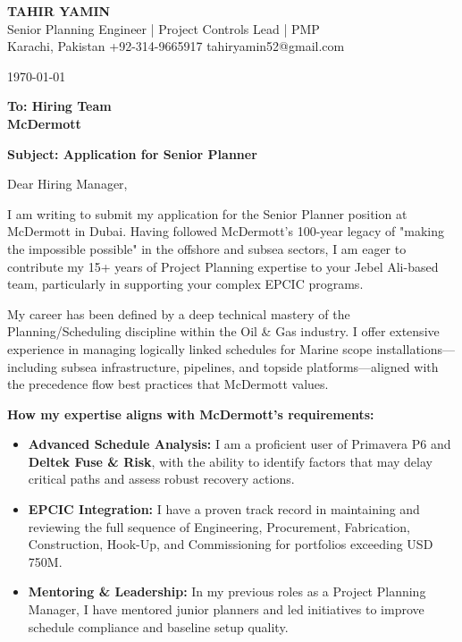 \documentclass[11pt,a4paper]{article}
\begin{document}
\begin{center}
    {\Huge \textbf{\color{awesome-darknight} TAHIR YAMIN}} \\[0.2cm]
    {\Large \color{awesome-gray} Senior Planning Engineer | Project Controls Lead | PMP} \\[0.3cm]
    
    \small \color{light-gray}
    Karachi, Pakistan \quad \textbullet \quad 
    +92-314-9665917 \quad \textbullet \quad 
    tahiryamin52@gmail.com
\end{center}

\vspace{0.8cm}
\today
\vspace{0.5cm}

\textbf{To: Hiring Team} \\
\textbf{McDermott} \\
\vspace{0.5cm}

\textbf{Subject: Application for Senior Planner}

\vspace{0.5cm}

Dear Hiring Manager,

I am writing to submit my application for the Senior Planner position at McDermott in Dubai. Having followed McDermott’s 100-year legacy of "making the impossible possible" in the offshore and subsea sectors, I am eager to contribute my 15+ years of Project Planning expertise to your Jebel Ali-based team, particularly in supporting your complex EPCIC programs.

My career has been defined by a deep technical mastery of the Planning/Scheduling discipline within the Oil \& Gas industry. I offer extensive experience in managing logically linked schedules for Marine scope installations—including subsea infrastructure, pipelines, and topside platforms—aligned with the precedence flow best practices that McDermott values.

\textbf{How my expertise aligns with McDermott’s requirements:}
\begin{itemize}
    \item \textbf{Advanced Schedule Analysis:} I am a proficient user of Primavera P6 and \textbf{Deltek Fuse \& Risk}, with the ability to identify factors that may delay critical paths and assess robust recovery actions.
    \item \textbf{EPCIC Integration:} I have a proven track record in maintaining and reviewing the full sequence of Engineering, Procurement, Fabrication, Construction, Hook-Up, and Commissioning for portfolios exceeding USD 750M.
    \item \textbf{Mentoring \& Leadership:} In my previous roles as a Project Planning Manager, I have mentored junior planners and led initiatives to improve schedule compliance and baseline setup quality.
\end{itemize}
\end{document}
